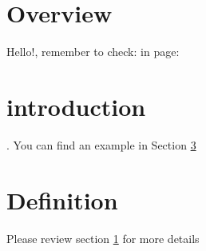 \documentclass{article}
\begin{document}
	\section{Overview}
	\label{sec:overview}
	Hello!, remember to check:  in page: \pageref{sec:overview}
	
	\paragraph{}
	\lipsum[2-2]
	
	\section{introduction}
	\lipsum[2-4].
	You can find an example in Section \ref{sec:def}
	
	\section{Definition}
	\label{sec:def}
	\lipsum[5-6]
	Please review section \ref{sec:overview} for more details
\end{document}
